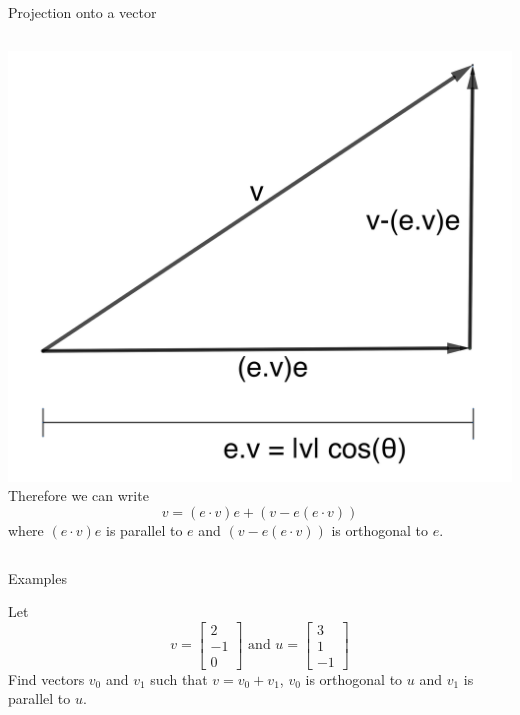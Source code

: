 \documentclass{beamer}
\begin{document}
\begin{frame}{Projection onto a vector}
  \begin{columns}
    \includegraphics[scale=1.7]{decomposition-vector.png}
    Therefore we can write
    \begin{equation*}
      v = (e\cdot v)e + (v- e(e\cdot v))
    \end{equation*}
    where $(e\cdot v)e$ is parallel to $e$ and $(v- e(e\cdot v))$ is orthogonal to $e$.
  \end{columns}
\end{frame}

\begin{frame}{Examples}
  \begin{example}
    Let
    \begin{equation*}
      v = \left[
	\begin{array}{c}
          2\\
          -1\\
          0
	\end{array}
      \right]\text{ and }
      u = \left[
	\begin{array}{c}
          3\\
          1\\
          -1
	\end{array}
      \right]
    \end{equation*}
    Find vectors $v_0$ and $v_1$ such that $v = v_0 + v_1$, $v_0$ is orthogonal to $u$ and $v_1$ is parallel to $u$.
  \end{example}
\end{frame}
\end{document}
